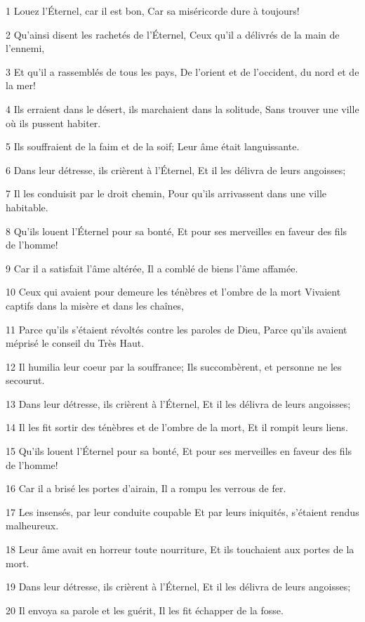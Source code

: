 \par 1 Louez l'Éternel, car il est bon, Car sa miséricorde dure à toujours!
\par 2 Qu'ainsi disent les rachetés de l'Éternel, Ceux qu'il a délivrés de la main de l'ennemi,
\par 3 Et qu'il a rassemblés de tous les pays, De l'orient et de l'occident, du nord et de la mer!
\par 4 Ils erraient dans le désert, ils marchaient dans la solitude, Sans trouver une ville où ils pussent habiter.
\par 5 Ils souffraient de la faim et de la soif; Leur âme était languissante.
\par 6 Dans leur détresse, ils crièrent à l'Éternel, Et il les délivra de leurs angoisses;
\par 7 Il les conduisit par le droit chemin, Pour qu'ils arrivassent dans une ville habitable.
\par 8 Qu'ils louent l'Éternel pour sa bonté, Et pour ses merveilles en faveur des fils de l'homme!
\par 9 Car il a satisfait l'âme altérée, Il a comblé de biens l'âme affamée.
\par 10 Ceux qui avaient pour demeure les ténèbres et l'ombre de la mort Vivaient captifs dans la misère et dans les chaînes,
\par 11 Parce qu'ils s'étaient révoltés contre les paroles de Dieu, Parce qu'ils avaient méprisé le conseil du Très Haut.
\par 12 Il humilia leur coeur par la souffrance; Ils succombèrent, et personne ne les secourut.
\par 13 Dans leur détresse, ils crièrent à l'Éternel, Et il les délivra de leurs angoisses;
\par 14 Il les fit sortir des ténèbres et de l'ombre de la mort, Et il rompit leurs liens.
\par 15 Qu'ils louent l'Éternel pour sa bonté, Et pour ses merveilles en faveur des fils de l'homme!
\par 16 Car il a brisé les portes d'airain, Il a rompu les verrous de fer.
\par 17 Les insensés, par leur conduite coupable Et par leurs iniquités, s'étaient rendus malheureux.
\par 18 Leur âme avait en horreur toute nourriture, Et ils touchaient aux portes de la mort.
\par 19 Dans leur détresse, ils crièrent à l'Éternel, Et il les délivra de leurs angoisses;
\par 20 Il envoya sa parole et les guérit, Il les fit échapper de la fosse.
